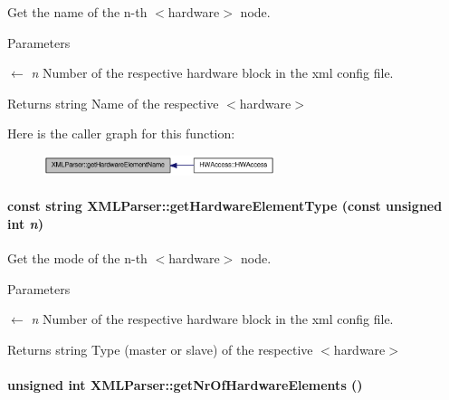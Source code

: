 Get the name of the n-\/th $<$hardware$>$ node. 
\begin{DoxyParams}{Parameters}
\item[\mbox{$\leftarrow$} {\em n}]Number of the respective hardware block in the xml config file. \end{DoxyParams}
\begin{DoxyReturn}{Returns}
string Name of the respective $<$hardware$>$ 
\end{DoxyReturn}


Here is the caller graph for this function:\nopagebreak
\begin{figure}[H]
\begin{center}
\leavevmode
\includegraphics[width=192pt]{class_x_m_l_parser_a94e96b54de258081ab16e2d91e690e22_icgraph}
\end{center}
\end{figure}
\hypertarget{class_x_m_l_parser_a7e60c5073d31cb9fd83644cb58f9f010}{
\paragraph[{getHardwareElementType}]{\setlength{\rightskip}{0pt plus 5cm}const string XMLParser::getHardwareElementType (const unsigned int {\em n})}\hfill}
\label{class_x_m_l_parser_a7e60c5073d31cb9fd83644cb58f9f010}


Get the mode of the n-\/th $<$hardware$>$ node. 
\begin{DoxyParams}{Parameters}
\item[\mbox{$\leftarrow$} {\em n}]Number of the respective hardware block in the xml config file. \end{DoxyParams}
\begin{DoxyReturn}{Returns}
string Type (master or slave) of the respective $<$hardware$>$ 
\end{DoxyReturn}
\hypertarget{class_x_m_l_parser_ae07c6d8e846b82d5a3e0dbbe97cba58b}{
\paragraph[{getNrOfHardwareElements}]{\setlength{\rightskip}{0pt plus 5cm}unsigned int XMLParser::getNrOfHardwareElements ()}\hfill}
\label{class_x_m_l_parser_ae07c6d8e846b82d5a3e0dbbe97cba58b}


